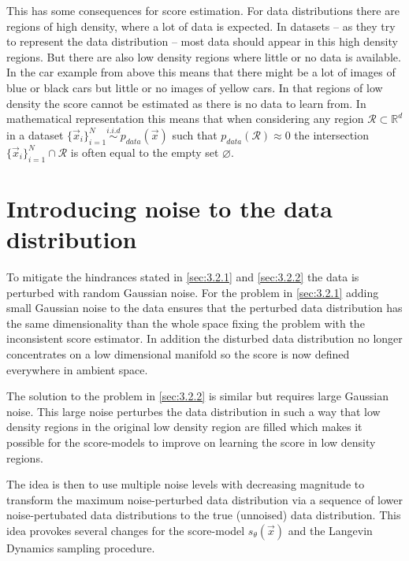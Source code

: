 This has some consequences for score estimation. For data distributions there are regions of high density, where a lot of data is expected. In datasets – as they try to represent the data distribution – most data should appear in this high density regions. But there are also low density regions where little or no data is available. In the car example from above this means that there might be a lot of images of blue or black cars but little or no images of yellow cars. In that regions of low density the score cannot be estimated as there is no data to learn from. In mathematical representation this means that when considering any region $\mathcal{R}\subset\mathbb{R}^d$ in a dataset $\{\vec{x}_i\}_{i=1}^N\overset{i.i.d}{\sim}p_{data}(\vec{x})$ such that $p_{data}(\mathcal{R})\approx0$ the intersection $\{\vec{x}_i\}_{i=1}^N\cap\mathcal{R}$ is often equal to the empty set $\varnothing$. 

\section[Introducing noise to the data distribution]{Introducing noise to the data distribution%
    } \label{sec:3.3}
To mitigate the hindrances stated in \cref{sec:3.2.1} and \cref{sec:3.2.2} the data is perturbed with random Gaussian noise. For the problem in \cref{sec:3.2.1} adding small Gaussian noise to the data ensures that the perturbed data distribution has the same dimensionality than the whole space fixing the problem with the inconsistent score estimator. In addition the disturbed data distribution no longer concentrates on a low dimensional manifold so the score is now defined everywhere in ambient space.

The solution to the problem in \cref{sec:3.2.2} is similar but requires large Gaussian noise. This large noise perturbes the data distribution in such a way that low density regions in the original low density region are filled which makes it possible for the score-models to improve on learning the score in low density regions.

The idea is then to use multiple noise levels with decreasing magnitude to transform the maximum noise-perturbed data distribution via a sequence of lower noise-pertubated data distributions to the true (unnoised) data distribution. This idea provokes several changes for the score-model $s_\theta(\vec{x})$ and the Langevin Dynamics sampling procedure.
%
